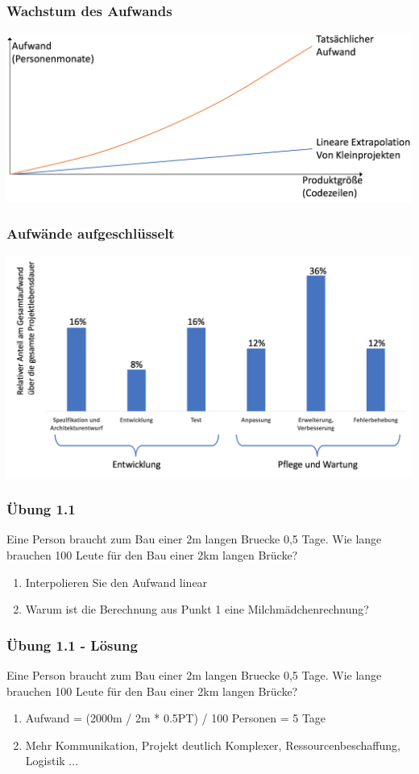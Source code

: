 \begin{frame}
\frametitle{Wachstum des Aufwands}
	\center\includegraphics[width=1\textwidth,
	keepaspectratio=true]{bilder/projektaufwand.png}
\end{frame}

\begin{frame}
\frametitle{Aufwände aufgeschlüsselt}
	\center\includegraphics[width=1\textwidth,
	keepaspectratio=true]{bilder/anteil_aufwand.png}
\end{frame}

\begin{frame}
\frametitle{Übung 1.1}
	Eine Person braucht zum Bau einer 2m langen Bruecke 0,5 Tage. Wie lange brauchen 100 Leute für den Bau einer 2km langen Brücke?
	\begin{enumerate}
		\item Interpolieren Sie den Aufwand linear
		\item Warum ist die Berechnung aus Punkt 1 eine Milchmädchenrechnung?
	\end{enumerate}
\end{frame}

\ifloesung
\begin{frame}
\frametitle{Übung 1.1 - Lösung}
	Eine Person braucht zum Bau einer 2m langen Bruecke 0,5 Tage. Wie lange brauchen 100 Leute für den Bau einer 2km langen Brücke?
	\begin{enumerate}
		\item Aufwand = (2000m / 2m * 0.5PT) / 100 Personen = 5 Tage
		\item Mehr Kommunikation, Projekt deutlich Komplexer, Ressourcenbeschaffung, Logistik ...
	\end{enumerate}
\end{frame}
\fi

